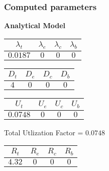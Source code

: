 \documentclass{article}
\begin{document}
\subsubsection{Computed parameters}
\begin{minipage}{0.5\textwidth}
\centering	\textbf{Analytical Model}
\begin{table}[H]
\centering
\begin{tabular}{@{}cccc@{}}
\toprule
$\lambda_t$ & $\lambda_e$ & $\lambda_c$ & $\lambda_b$\\
\midrule
$0.0187$ & $0$ & $0$ & $0$\\
\bottomrule
\end{tabular}
\end{table}\begin{table}[H]
\centering
\begin{tabular}{@{}cccc@{}}
\toprule
$D_t$ & $D_e$ & $D_c$ & $D_b$\\
\midrule
$4$ & $0$ & $0$ & $0$\\
\bottomrule
\end{tabular}
\end{table}\begin{table}[H]
\centering
\begin{tabular}{@{}cccc@{}}
\toprule
$U_t$ & $U_e$ & $U_c$ & $U_b$\\
\midrule
$0.0748$ & $0$ & $0$ & $0$\\
\bottomrule
\end{tabular}
\end{table}
\centering Total Utlization Factor = $0.0748$
\begin{table}[H]
\centering
\begin{tabular}{@{}cccc@{}}
\toprule
$R_t$ & $R_e$ & $R_c$ & $R_b$\\
\midrule
$4.32$ & $0$ & $0$ & $0$\\
\bottomrule
\end{tabular}
\end{table}
\end{minipage}
\end{document}
